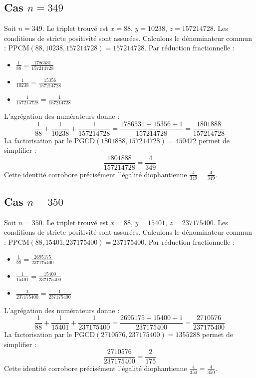 \documentclass[11pt,a4paper]{article}
\begin{document}
\subsection{Cas $n = 349$}
Soit $n = 349$. Le triplet trouvé est $x = 88$, $y = 10238$, $z = 157214728$.
Les conditions de stricte positivité sont assurées.
Calculons le dénominateur commun : $\text{PPCM}(88, 10238, 157214728) = 157214728$.
Par réduction fractionnelle :
\begin{itemize}
    \item $\frac{1}{88} = \frac{1786531}{157214728}$
    \item $\frac{1}{10238} = \frac{15356}{157214728}$
    \item $\frac{1}{157214728} = \frac{1}{157214728}$
\end{itemize}
L'agrégation des numérateurs donne :
$$ \frac{1}{88} + \frac{1}{10238} + \frac{1}{157214728} = \frac{1786531 + 15356 + 1}{157214728} = \frac{1801888}{157214728} $$
La factorisation par le $\text{PGCD}(1801888, 157214728) = 450472$ permet de simplifier :
$$ \frac{1801888}{157214728} = \frac{4}{349} $$
Cette identité corrobore précisément l'égalité diophantienne $\frac{4}{349} = \frac{4}{349}$.

\subsection{Cas $n = 350$}
Soit $n = 350$. Le triplet trouvé est $x = 88$, $y = 15401$, $z = 237175400$.
Les conditions de stricte positivité sont assurées.
Calculons le dénominateur commun : $\text{PPCM}(88, 15401, 237175400) = 237175400$.
Par réduction fractionnelle :
\begin{itemize}
    \item $\frac{1}{88} = \frac{2695175}{237175400}$
    \item $\frac{1}{15401} = \frac{15400}{237175400}$
    \item $\frac{1}{237175400} = \frac{1}{237175400}$
\end{itemize}
L'agrégation des numérateurs donne :
$$ \frac{1}{88} + \frac{1}{15401} + \frac{1}{237175400} = \frac{2695175 + 15400 + 1}{237175400} = \frac{2710576}{237175400} $$
La factorisation par le $\text{PGCD}(2710576, 237175400) = 1355288$ permet de simplifier :
$$ \frac{2710576}{237175400} = \frac{2}{175} $$
Cette identité corrobore précisément l'égalité diophantienne $\frac{4}{350} = \frac{4}{350}$.
\end{document}
